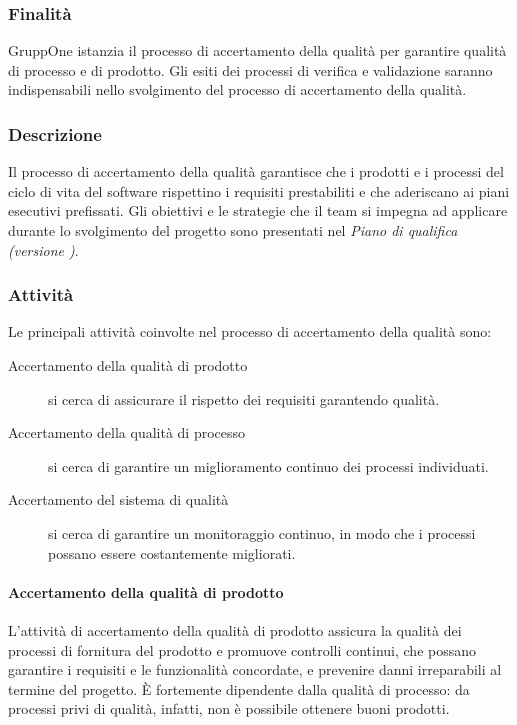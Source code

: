 \documentclass[../../norme-di-progetto.tex]{subfiles}
\begin{document}
\subsubsection{Finalità}%
\label{subs:accertamento_della_qualita/finalita}

GruppOne istanzia il processo di accertamento della qualità per garantire qualità di processo e di prodotto.
Gli esiti dei processi di verifica e validazione saranno indispensabili nello svolgimento del processo di accertamento della qualità.

\subsubsection{Descrizione}%
\label{subs:accertamento_della_qualita/descrizione}

Il processo di accertamento della qualità garantisce che i prodotti e i processi del ciclo di vita del software rispettino i requisiti prestabiliti e che aderiscano ai piani esecutivi prefissati.
Gli obiettivi e le strategie che il team si impegna ad applicare durante lo svolgimento del progetto sono presentati nel \textit{Piano di qualifica (versione \versione)}.

\subsubsection{Attività}%
\label{subs:accertamento_della_qualita/attivita}

Le principali attività coinvolte nel processo di accertamento della qualità sono:

\begin{description}
  \item[Accertamento della qualità di prodotto] si cerca di assicurare il rispetto dei requisiti garantendo qualità.
  \item[Accertamento della qualità di processo] si cerca di garantire un miglioramento continuo dei processi individuati.
  \item[Accertamento del sistema di qualità] si cerca di garantire un monitoraggio continuo, in modo che i processi possano essere costantemente migliorati.
\end{description}

\paragraph{Accertamento della qualità di prodotto}%
\label{par:accertamento_della_qualita_di_prodotto/attivita}
L'attività di accertamento della qualità di prodotto assicura la qualità dei processi di fornitura del prodotto e promuove controlli continui, che possano garantire i requisiti e le funzionalità concordate, e prevenire danni irreparabili al termine del progetto.
È fortemente dipendente dalla qualità di processo: da processi privi di qualità, infatti, non è possibile ottenere buoni prodotti.
\end{document}
